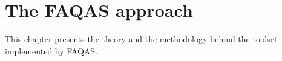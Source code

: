 
\chapter{The FAQAS approach}
\label{chapter:approach}

This chapter presents the theory and the methodology behind the toolset implemented by FAQAS.









